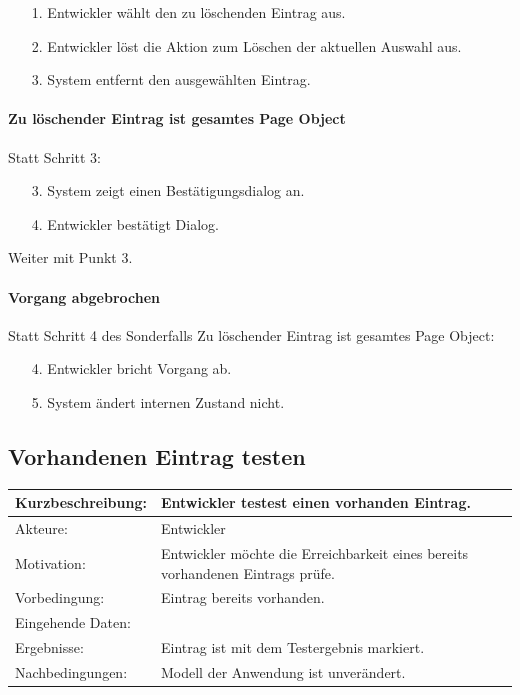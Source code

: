 \begin{itemize}[itemsep=0pt]
\item[1.] Entwickler wählt den zu löschenden Eintrag aus.
\item[2.] Entwickler löst die Aktion zum Löschen der aktuellen Auswahl aus. 
\item[3.] System entfernt den ausgewählten Eintrag.
\end{itemize}

\paragraph{Zu löschender Eintrag ist gesamtes Page Object}
Statt Schritt 3:
\begin{itemize}[itemsep=0pt]
\item[3.] System zeigt einen Bestätigungsdialog an. 
\item[4.] Entwickler bestätigt Dialog. 
\end{itemize}
Weiter mit Punkt 3. 

\paragraph{Vorgang abgebrochen}
Statt Schritt 4 des Sonderfalls \grq Zu löschender Eintrag ist gesamtes Page Object\grq:
\begin{itemize}[itemsep=0pt]
\item[4.] Entwickler bricht Vorgang ab. 
\item[5.] System ändert internen Zustand nicht. 
\end{itemize}

\subsection{Vorhandenen Eintrag testen}
\label{sec:test_entry}

\begin{tabular}[h]{|p{4cm}|p{}|}
\hline 
\rule[-1ex]{0pt}{2.5ex}Kurzbeschreibung: & 
Entwickler testest einen vorhanden Eintrag. \\  
\hline 
\rule[-1ex]{0pt}{2.5ex}Akteure: & 
Entwickler \\ 
\hline 
\rule[-1ex]{0pt}{2.5ex}Motivation: & 
Entwickler möchte die Erreichbarkeit eines bereits vorhandenen Eintrags prüfe. \\ 
\hline 
\rule[-1ex]{0pt}{2.5ex}Vorbedingung: & 
Eintrag bereits vorhanden. \\ 
\hline 
\rule[-1ex]{0pt}{2.5ex}Eingehende Daten: & \\ 
\hline 
\rule[-1ex]{0pt}{2.5ex}Ergebnisse: & Eintrag ist mit dem Testergebnis markiert. \\ 
\hline 
\rule[-1ex]{0pt}{2.5ex}Nachbedingungen: & Modell der Anwendung ist unverändert.  \\ 
\hline 
\end{tabular} 


